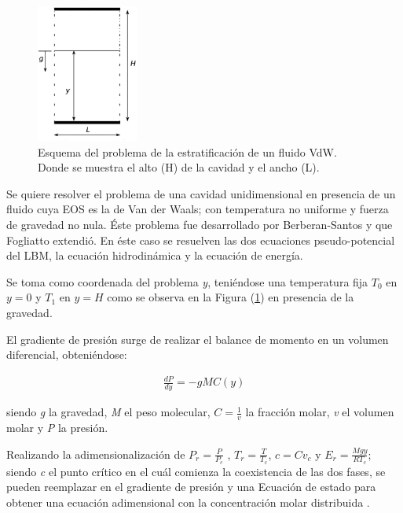 \begin{figure}[htbp]
	\centering
	\includegraphics[width=0.3\textwidth]{figs/cap4/esquema_problema_VdW}
	\caption{Esquema del problema de la estratificación de un fluido VdW. Donde se muestra el alto (H) de la cavidad y el ancho (L).} 
	\label{fig:esquema_VdW}	
\end{figure}

Se quiere resolver el problema de una cavidad unidimensional en presencia de un fluido cuya EOS es la de Van der Waals; con temperatura  no uniforme y fuerza de gravedad no nula. Éste problema fue desarrollado por Berberan-Santos \cite{berberan2002liquid} y que Fogliatto \cite{fogliatto2019simulation} extendió. En éste caso se resuelven las dos ecuaciones pseudo-potencial del LBM, la ecuación hidrodinámica y la ecuación de energía.

Se toma como coordenada del problema \textit{y}, teniéndose una temperatura fija $T_{0}$ en $y = 0$ y $T_{1}$ en $y = H$ como se observa en la Figura (\ref{fig:esquema_VdW}) en presencia de la gravedad.

El gradiente de presión surge de realizar el balance de momento en un volumen diferencial, obteniéndose:

\begin{align}
	\frac{d P}{d y} = - g M C(y)
\end{align}

siendo \textit{g} la gravedad, \textit{M} el peso molecular, $C = \frac{1}{v}$ la fracción molar, \textit{v} el volumen molar y \textit{P} la presión.

Realizando la adimensionalización de $ P_r = \frac{P}{P_c}$ , $ T_r = \frac{T}{T_c}$, $c = C v_c$ y $E_r = \frac{M g y}{R T_c}$; siendo \textit{c} el punto crítico en el cuál comienza la coexistencia de las dos fases, se pueden reemplazar en el gradiente de presión y una Ecuación de estado para obtener una ecuación adimensional con la concentración molar distribuida \cite{fogliatto2019simulation}.



